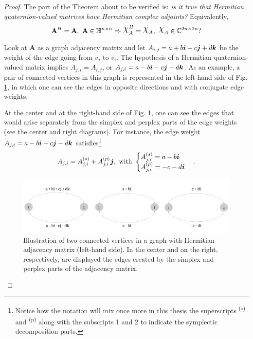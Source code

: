 \begin{proof}
    The part of the Theorem about to be verified is: \emph{is it true that Hermitian quaternion-valued matrices have Hermitian complex adjoints?} Equivalently,
    \begin{equation}
        \mathbf{A}^H = \mathbf{A}, \ \mathbf{A} \in \mathbb{H}^{n \times n} \Rightarrow
        \rchi_{A}^H = \rchi_{A}, \ \rchi_{A} \in \mathbb{C}^{2n \times 2n}?
    \end{equation}

    Look at $\mathbf{A}$ as a graph adjacency matrix and let $A_{i,j} = a + b\boldsymbol{i} + c\boldsymbol{j} + d\boldsymbol{k}$ be the weight of the edge going from $v_j$ to $v_i$. The hypothesis of a Hermitian quaternion-valued matrix implies $A_{j,i} = \overline{A_{i,j}}$, or $A_{j,i} = a - b\boldsymbol{i} - c\boldsymbol{j} - d\boldsymbol{k}$. As an example, a pair of connected vertices in this graph is represented in the left-hand side of Fig. \ref{fig:hermitian-crop-2}, in which one can see the edges in opposite directions and with conjugate edge weights.

    At the center and at the right-hand side of Fig. \ref{fig:hermitian-crop-2}, one can see the edges that would arise separately from the simplex and perplex parts of the edge weights (see the center and right diagrams). For instance, the edge weight $A_{j,i} = a - b\boldsymbol{i} - c\boldsymbol{j} - d\boldsymbol{k}$ satisfies\footnote{Notice how the notation will mix once more in this thesis the superscripts \textsuperscript{(s)} and \textsuperscript{(p)} along with the subscripts 1 and 2 to indicate the symplectic decomposition parts.}
    \begin{equation}
        A_{j,i} = A^{(s)}_{j,i} + A^{(p)}_{j,i} \boldsymbol{j}, \text{ with }
        \begin{cases}
            A^{(s)}_{j,i} = a - b\boldsymbol{i} \\
            A^{(p)}_{j,i} = -c -d \boldsymbol{i}
        \end{cases}.
    \end{equation}

    \begin{figure}
        \centering
        \includegraphics[width=0.95\linewidth]{Figures/hermitian-crop-2.pdf}
        \caption{Illustration of two connected vertices in a graph with Hermitian adjacency matrix (left-hand side). In the center and on the right, respectively, are displayed the edges created by the simplex and perplex parts of the adjacency matrix.}
        \label{fig:hermitian-crop-2}
    \end{figure}


\end{proof}
